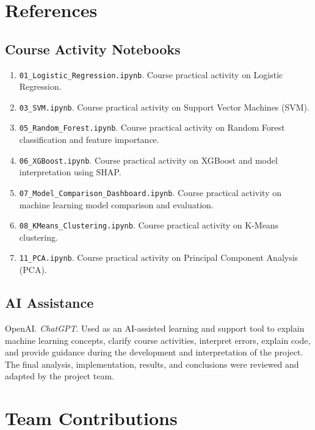 \documentclass[11pt]{article}
\begin{document}
\newpage
\section*{References}

\subsection*{Course Activity Notebooks}

\begin{enumerate}[label=\arabic*.]
    \item \texttt{01\_Logistic\_Regression.ipynb}. Course practical activity on Logistic Regression.
    \item \texttt{03\_SVM.ipynb}. Course practical activity on Support Vector Machines (SVM).
    \item \texttt{05\_Random\_Forest.ipynb}. Course practical activity on Random Forest classification and feature importance.
    \item \texttt{06\_XGBoost.ipynb}. Course practical activity on XGBoost and model interpretation using SHAP.
    \item \texttt{07\_Model\_Comparison\_Dashboard.ipynb}. Course practical activity on machine learning model comparison and evaluation.
    \item \texttt{08\_KMeans\_Clustering.ipynb}. Course practical activity on K-Means clustering.
    \item \texttt{11\_PCA.ipynb}. Course practical activity on Principal Component Analysis (PCA).
\end{enumerate}

\subsection*{AI Assistance}

OpenAI. \textit{ChatGPT}. Used as an AI-assisted learning and support tool to explain machine learning concepts, clarify course activities, interpret errors, explain code, and provide guidance during the development and interpretation of the project. The final analysis, implementation, results, and conclusions were reviewed and adapted by the project team.


\section*{Team Contributions}
\end{document}
